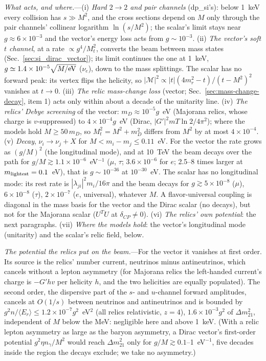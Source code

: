 \documentclass[11pt,a4paper]{article}
\begin{document}
\textit{What acts, and where.}---(i) \emph{Hard $2\to2$ and pair channels} (dp\_si's): below 1~keV every collision
has $s \gg M^2$, and the cross sections depend on $M$ only through the pair channels' collinear logarithm
$\ln(s/M^2)$; the scalar's limit stays near $g \approx 6\times10^{-3}$ and the vector's energy loss acts from
$g\sim10^{-3}$. (ii) \emph{The vector's soft $t$ channel}, at a rate $\propto g^4/M_t^2$, converts the beam between mass
states (Sec.~\ref{sec:si_dirac_vector}); its limit continues the one at 1~keV, $g \simeq 1.4\times10^{-5}\sqrt{M/{\rm
eV}}$ ($\nu_e$), down to the mass splittings. The scalar has no forward peak: its vertex flips the helicity, so
$|\mathcal{M}|^2 \propto |t|(4m_r^2 - t)/(t - M^2)^2$ vanishes at $t\to0$. (iii) \emph{The relic mass-change loss}
(vector; Sec.~\ref{sec:mass-change-decay}, item 1) acts only within about a decade of the unitarity line. (iv) \emph{The
relics' Debye screening} of the vector: $m_D \approx 10^{-5}g$~eV (Majorana relics, whose charge is $v$-suppressed) to
$4\times10^{-4}g$~eV (Dirac, $|G'|^2 mT\ln2/4\pi^2$); where the models hold $M \ge 50\,m_D$, so $M_t^2 = M^2 + m_D^2$
differs from $M^2$ by at most $4\times10^{-4}$. (v) \emph{Decay}, $\nu_i \to \nu_j + X$ for $M < m_i - m_j \le 0.11$~eV.
For the vector the rate grows as $(g/M)^2$ (the longitudinal mode), and at 10~TeV the beam decays over the path for
$g/M \gtrsim 1.1\times10^{-6}$~eV$^{-1}$ ($\mu$, $\tau$; $3.6\times10^{-6}$ for $e$; 2.5--8 times larger at
$m_{\rm lightest} = 0.1$~eV), that is $g \sim 10^{-36}$ at $10^{-30}$~eV. The scalar has no longitudinal mode: its rest
rate is $|\lambda_{ji}|^2m_i/16\pi$ and the beam decays for $g \gtrsim 5\times10^{-8}$ ($\mu$), $6\times10^{-8}$ ($\tau$),
$2\times10^{-7}$ ($e$, universal), whatever $M$. A flavor-universal coupling is diagonal in the mass basis for the vector
and the Dirac scalar (no decays), but not for the Majorana scalar ($U^TU$ at $\delta_{CP}\ne0$). (vi) \emph{The relics'
own potential}: the next paragraphs. (vii) \emph{Where the models hold}: the vector's longitudinal mode (unitarity) and
the scalar's relic field, below.

\textit{The potential the relics put on the beam.}---For the vector it vanishes at first order. Its source is the relics'
number current, neutrinos minus antineutrinos, which cancels without a lepton asymmetry (for Majorana relics the
left-handed current's charge is $-G'hv$ per helicity $h$, and the two helicities are equally populated). The second
order, the dispersive part of the $s$- and $u$-channel forward amplitudes, cancels at $O(1/s)$ between neutrinos and
antineutrinos and is bounded by $g^2n/\langle E_r\rangle \le 1.2\times10^{-7}g^2$~eV$^2$ (all relics relativistic, $z = 4$),
$1.6\times10^{-3}g^2$ of $\Delta m^2_{21}$, independent of $M$ below the MeV: negligible here and above 1~keV. (With a relic
lepton asymmetry as large as the baryon asymmetry, a Dirac vector's first-order potential $g^2\eta n_\gamma/M^2$ would
reach $\Delta m^2_{21}$ only for $g/M \gtrsim 0.1$--1~eV$^{-1}$, five decades inside the region the decays exclude; we
take no asymmetry.)
\end{document}
